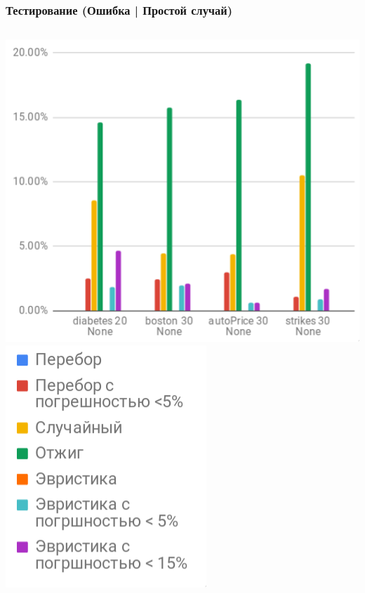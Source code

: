 \documentclass{beamer}
\begin{document}
\begin{frame}
    \frametitle{Тестирование (Ошибка | Простой случай)}
    \vfill
    \begin{columns}
        \includegraphics[width=\textwidth]{error_easy.png}
        \includegraphics[width=\textwidth]{time_legend.png}
    \end{columns}
\end{frame}
\end{document}
